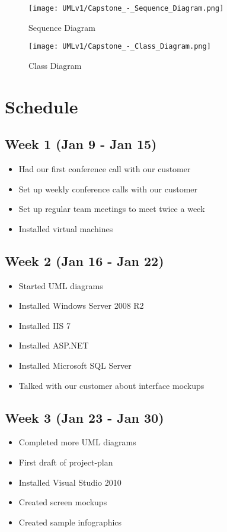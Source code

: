 \documentclass[11pt,a4paper,oneside]{article}
\begin{document}
\begin{figure}[!]
\caption{Sequence Diagram}
\texttt{[image: UMLv1/Capstone\_-\_Sequence\_Diagram.png]}\\
\end{figure}


\begin{figure}[!]
\caption{Class Diagram}
\texttt{[image: UMLv1/Capstone\_-\_Class\_Diagram.png]}\\
\end{figure}


\section{Schedule}

\subsection{Week 1 (Jan 9 - Jan 15)}
\begin{itemize}
\item Had our first conference call with our customer
\item Set up weekly conference calls with our customer
\item Set up regular team meetings to meet twice a week
\item Installed virtual machines
\end{itemize}


\subsection{Week 2 (Jan 16 - Jan 22)}
\begin{itemize}
\item Started UML diagrams
\item Installed Windows Server 2008 R2
\item Installed IIS 7
\item Installed ASP.NET
\item Installed Microsoft SQL Server
\item Talked with our customer about interface mockups
\end{itemize}

\subsection{Week 3 (Jan 23 - Jan 30)}
\begin{itemize}
\item Completed more UML diagrams
\item First draft of project-plan
\item Installed Visual Studio 2010
\item Created screen mockups
\item Created sample infographics
\end{itemize}
\end{document}
